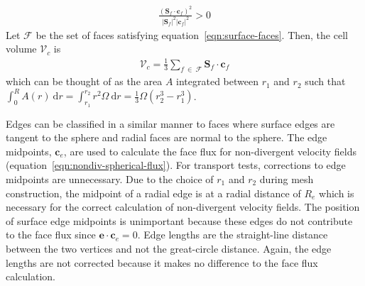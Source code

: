 \begin{align}
	\frac{\left(\mathbf{S}_f \cdot \mathbf{c}_f\right)^2}{\left\lvert \mathbf{S}_f \right\rvert^2 \left\lvert \mathbf{c}_f \right\rvert^2} > 0 \label{eqn:surface-faces}
\end{align}
Let $\mathcal{F}$ be the set of faces satisfying equation~\eqref{eqn:surface-faces}.  Then, the cell volume $\mathcal{V}_c$ is
\begin{align}
	\mathcal{V}_c = \frac{1}{3} \sum_{f\:\in\:\mathcal{F}} \mathbf{S}_f \cdot \mathbf{c}_f
\end{align}
which can be thought of as the area $A$ integrated between $r_1$ and $r_2$ such that 
$\int_0^R{A(r)\:\mathrm{d}r} = \int_{r_1}^{r_2}{r^2 \Omega\:\mathrm{d}r} = \frac{1}{3} \Omega \left( r_2^3 - r_1^3 \right)$.

Edges can be classified in a similar manner to faces where surface edges are tangent to the sphere and radial faces are normal to the sphere.  The edge midpoints, $\mathbf{c}_e$, are used to calculate the face flux for non-divergent velocity fields (equation~\ref{eqn:nondiv-spherical-flux}).
For transport tests, corrections to edge midpoints are unnecessary.  Due to the choice of $r_1$ and $r_2$ during mesh construction, the midpoint of a radial edge is at a radial distance of $R_e$ which is necessary for the correct calculation of non-divergent velocity fields.
The position of surface edge midpoints is unimportant because these edges do not contribute to the face flux since $\mathbf{e} \cdot \mathbf{c}_e = 0$.
Edge lengths are the straight-line distance between the two vertices and not the great-circle distance.  Again, the edge lengths are not corrected because it makes no difference to the face flux calculation.

